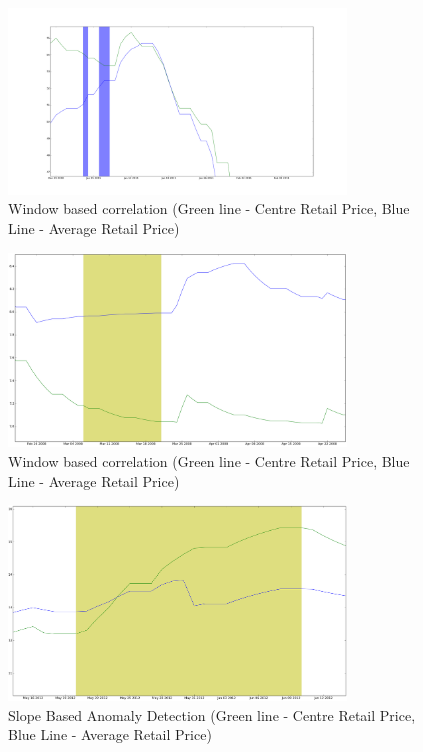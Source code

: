 \documentclass[a4paper,10pt]{article}
\begin{document}
\begin{figure}[H]
\centering
\includegraphics[width=0.8\textwidth]{graphs/20110106_0108.png}
\caption{Window based correlation (Green line - Centre Retail Price, Blue Line - Average Retail Price)}
\label{fig:20110106_0108}
\end{figure}

\begin{figure}[H]
\centering
\includegraphics[width=0.8\textwidth]{graphs/20080306_0320.png}
\caption{Window based correlation (Green line - Centre Retail Price, Blue Line - Average Retail Price)}
\label{fig:20080306_0320}
\end{figure}

\begin{figure}[H]
\centering
\includegraphics[width=0.8\textwidth]{graphs/12111.png}
\caption{Slope Based Anomaly Detection (Green line - Centre Retail Price, Blue Line - Average Retail Price)}
\label{fig:12111}
\end{figure}
\end{document}
